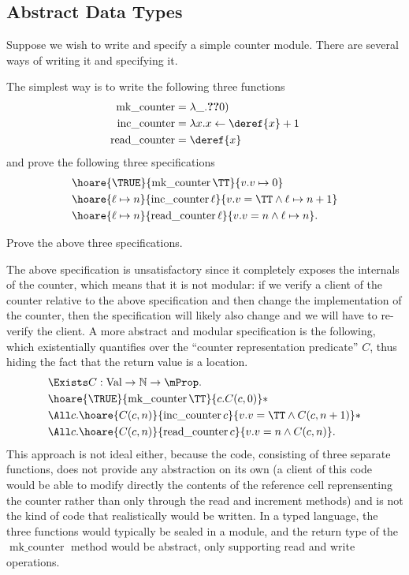 \subsection{Abstract Data Types}
\label{sec:abstract-data-types}
Suppose we wish to write and specify a simple counter module.
There are several ways of writing it and specifying it.

The simplest way is to write the following three functions
\begin{align*}
  \operatorname{mk\_counter} &= \lambda \_ . \Ref(0)\\
  \operatorname{inc\_counter} &= \lambda x . x \gets \deref{x} + 1\\
  \operatorname{read\_counter} &=  \deref{x}
\end{align*}
and prove the following three specifications
\begin{align*}
  &\hoare{\TRUE}{\operatorname{mk\_counter} \TT}{v. v \pointsto 0}\\
  &\hoare{\ell \pointsto n}{\operatorname{inc\_counter} \ell}{v. v = \TT \land \ell \pointsto n + 1}\\
  &\hoare{\ell \pointsto n}{\operatorname{read\_counter} \ell}{v. v = n \land \ell \pointsto n}.
\end{align*}
\begin{exercise}
  Prove the above three specifications.
\end{exercise}


The above specification is unsatisfactory since it completely exposes
the internals of the counter, which means that it is not modular: if
we verify a client of the counter relative to the above specification
and then change the implementation of the counter, then the
specification will likely also change and we will have to re-verify
the client.  A more abstract and modular specification is the
following, which existentially quantifies over the ``counter
representation predicate'' $C$, thus hiding the fact that the return
value is a location.
\begin{align}
  \label{eq:counter-example:specification-style-we-use}
  \begin{split}
    &\Exists C : \Val \to \NN \to \Prop.\\
    &\hoare{\TRUE}{\operatorname{mk\_counter} \TT}{c. C(c, 0)} \ast \\
    &\All c . \hoare{C(c, n)}{\operatorname{inc\_counter} c}{v. v = \TT \land C(c, n + 1)} \ast\\
    &\All c . \hoare{C(c, n)}{\operatorname{read\_counter} c}{v. v = n \land C(c, n)}.
  \end{split}
\end{align}
This approach is not ideal either, because the code, consisting of
three separate functions, does not provide any abstraction on its own
(a client of this code would be able to modify directly the contents of the
reference cell reprensenting the 
counter rather than only through the read and increment methods)
and is not the kind of code that realistically would be written.  In a
typed language, the three functions would typically be sealed in a module,
and the return type of the $\operatorname{mk\_counter}$
method would be abstract, only supporting read and write operations.

